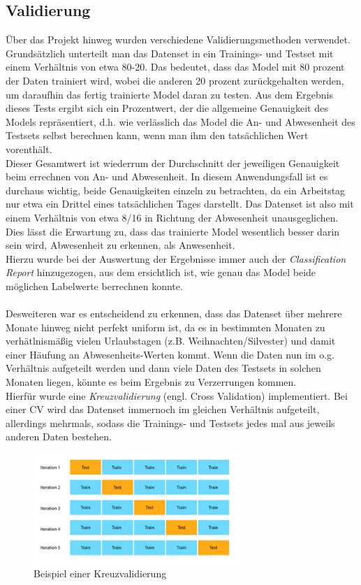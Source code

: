 \subsection{Validierung}
\sloppy
Über das Projekt hinweg wurden verschiedene Validierungsmethoden verwendet. Grundsätzlich unterteilt man das 
Datenset in ein Trainings- und Testset mit einem Verhältnis von etwa 80-20. Das bedeutet, dass das Model mit
80 prozent der Daten trainiert wird, wobei die anderen 20 prozent zurückgehalten werden, um daraufhin das 
fertig trainierte Model daran zu testen. Aus dem Ergebnis dieses Tests ergibt sich ein Prozentwert, der die 
allgemeine Genauigkeit des Models repräsentiert, d.h. wie verlässlich das Model die An- und Abwesenheit des 
Testsets selbst berechnen kann, wenn man ihm den tatsächlichen Wert vorenthält.\\
Dieser Gesamtwert ist wiederrum der Durchschnitt der jeweiligen Genauigkeit beim errechnen von An- und 
Abwesenheit. In diesem Anwendungsfall ist es durchaus wichtig, beide Genauigkeiten einzeln zu betrachten, 
da ein Arbeitstag nur etwa ein Drittel eines tatsächlichen Tages darstellt. 
Das Datenset ist also mit einem Verhältnis von etwa 8/16 in Richtung der Abwesenheit unausgeglichen. Dies 
lässt die Erwartung zu, dass das trainierte Model wesentlich besser darin sein wird, Abwesenheit zu erkennen,
als Anwesenheit.\\
Hierzu wurde bei der Auswertung der Ergebnisse immer auch der \textit{Classification Report} hinzugezogen,
aus dem ersichtlich ist, wie genau das Model beide möglichen Labelwerte berrechnen konnte.\\\\
Desweiteren war es entscheidend zu erkennen, dass das Datenset über mehrere Monate hinweg nicht perfekt uniform 
ist, da es in bestimmten Monaten zu verhätlnismäßig vielen Urlaubstagen (z.B. Weihnachten/Silvester) und damit 
einer Häufung an Abwesenheits-Werten kommt.
Wenn die Daten nun im o.g. Verhältnis aufgeteilt werden und dann viele Daten des Testsets in solchen Monaten 
liegen, könnte es beim Ergebnis zu Verzerrungen kommen.\\
Hierfür wurde eine \textit{Kreuzvalidierung} (engl. Cross Validation) implementiert. Bei einer CV wird das 
Datenset immernoch im gleichen Verhältnis aufgeteilt, allerdings mehrmals, sodass die Trainings- und Testsets 
jedes mal aus jeweils anderen Daten bestehen.

\begin{figure}[h]
    \centering
    \includegraphics[width=0.7\textwidth]{pic/CV.png}
    \caption{Beispiel einer Kreuzvalidierung}
    \label{fig:CV}
\end{figure}

